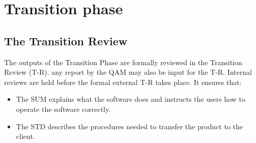 \chapter{Transition phase} \label{chap:transitionPhase}
\section{The Transition Review}

The outputs of the Transition Phase are formally reviewed in the Transition Review (T-R). any report by the QAM may also be input for the T-R. Internal reviews are held  before the formal external T-R takes place. It ensures that:
\begin{itemize}
\item The SUM explains what the software does and instructs the users how to operate the software correctly.
\item The STD describes the procedures needed to transfer the product to the client.
\end{itemize}
